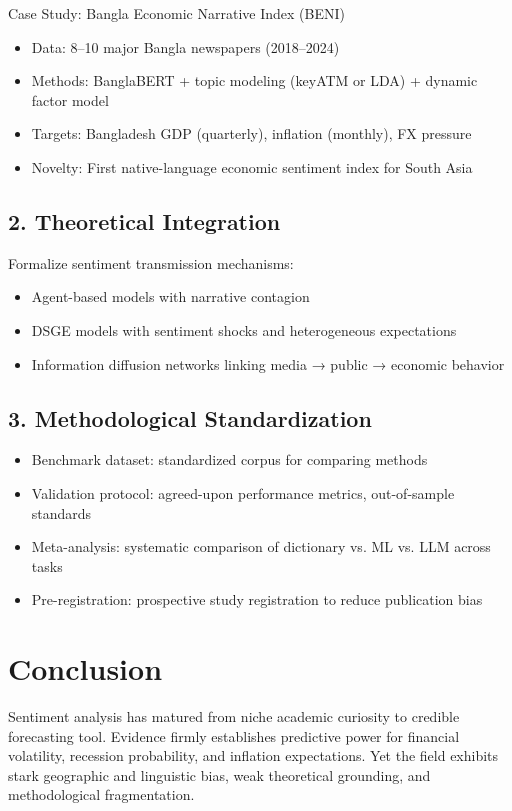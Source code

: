 \documentclass[11pt]{article}
\begin{document}
{{Case Study: Bangla Economic Narrative Index (BENI)
\begin{itemize}
\item Data: 8--10 major Bangla newspapers (2018--2024)
\item Methods: BanglaBERT + topic modeling (keyATM or LDA) + dynamic factor model
\item Targets: Bangladesh GDP (quarterly), inflation (monthly), FX pressure
\item Novelty: First native-language economic sentiment index for South Asia
\end{itemize}

\subsection{2. Theoretical Integration}

Formalize sentiment transmission mechanisms:
\begin{itemize}
\item Agent-based models with narrative contagion
\item DSGE models with sentiment shocks and heterogeneous expectations
\item Information diffusion networks linking media → public → economic behavior
\end{itemize}

\subsection{3. Methodological Standardization}

\begin{itemize}
\item Benchmark dataset: standardized corpus for comparing methods
\item Validation protocol: agreed-upon performance metrics, out-of-sample standards
\item Meta-analysis: systematic comparison of dictionary vs. ML vs. LLM across tasks
\item Pre-registration: prospective study registration to reduce publication bias
\end{itemize}

\section{Conclusion}

Sentiment analysis has matured from niche academic curiosity to credible forecasting tool. Evidence firmly establishes predictive power for financial volatility, recession probability, and inflation expectations. Yet the field exhibits stark geographic and linguistic bias, weak theoretical grounding, and methodological fragmentation.

}}
\end{document}
